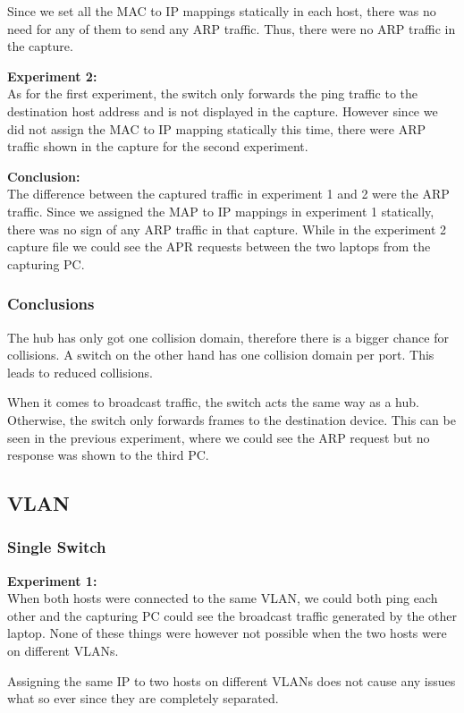 \documentclass[11pt,parskip=half]{scrartcl}
\begin{document}
Since we set all the MAC to IP mappings statically in each host, there
was no need for any of them to send any ARP traffic. Thus, there were no
ARP traffic in the capture.

\textbf{Experiment 2:}\\
As for the first experiment, the switch only forwards the ping traffic to
the destination host address and is not displayed in the capture. However since we did not assign the MAC to IP mapping statically this time, there
were ARP traffic shown in the capture for the second experiment.

\textbf{Conclusion:}\\
The difference between the captured traffic in experiment 1 and 2 were
the ARP traffic. Since we assigned the MAP to IP mappings in experiment 1
statically, there was no sign of any ARP traffic in that capture. While
in the experiment 2 capture file we could see the APR requests between the
two laptops from the capturing PC.

\subsubsection{Conclusions}
The hub has only got one collision domain, therefore there is a bigger
chance for collisions. A switch on the other hand has one collision domain
per port. This leads to reduced collisions.
  
When it comes to broadcast traffic, the switch acts the same way as a hub.
Otherwise, the switch only forwards frames to the destination device. This
can be seen in the previous experiment, where we could see the ARP request
but no response was shown to the third PC.

\subsection{VLAN}
\subsubsection{Single Switch}
\textbf{Experiment 1:}\\
When both hosts were connected to the same VLAN, we could both ping each
other and the capturing PC could see the broadcast traffic generated by the
other laptop. None of these things were however not possible when the two
hosts were on different VLANs.
  
Assigning the same IP to two hosts on different VLANs does not cause any
issues what so ever since they are completely separated.
\end{document}
